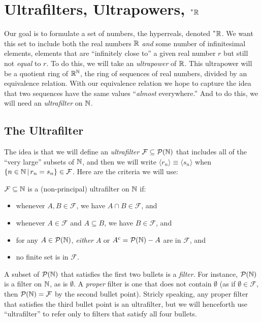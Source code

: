 \section{Ultrafilters, Ultrapowers, \texorpdfstring{$\prescript{*}{}{\mathbb{R}}$}{*R}}
Our goal is to formulate a set of numbers, the hyperreals, denoted $\prescript{*}{}{\mathbb{R}}$. We want this set to include both the real numbers $\mathbb{R}$ \textit{and} some number of infinitesimal elements, elements that are ``infinitely close to'' a given real number $r$ but still not \textit{equal} to $r$. To do this, we will take an \textit{ultrapower} of $\mathbb{R}$. This ultrapower will be a quotient ring of $\mathbb{R}^{\mathbb{N}}$, the ring of sequences of real numbers, divided by an equivalence relation. With our equivalence relation we hope to capture the idea that two sequences have the same values ``\textit{almost} everywhere.'' And to do this, we will need an \textit{ultrafilter} on $\mathbb{N}$.

\subsection{The Ultrafilter}
The idea is that we will define an \textit{ultrafilter} $\mathcal{F} \subseteq \mathcal{P}(\mathbb{N})$ that includes all of the ``very large'' subsets of $\mathbb{N}$, and then we will write $\langle r_n \rangle \equiv \langle s_n \rangle$ when $\{n \in \mathbb{N} \,|\, r_n = s_n\} \in \mathcal{F}$. Here are the criteria we will use:

\begin{defn}
    $\mathcal{F} \subseteq \mathbb{N}$ is a (non-principal) ultrafilter on $\mathbb{N}$ if:
    \begin{itemize}
        \item whenever $A, B \in \mathcal{F}$, we have $A \cap B \in \mathcal{F}$, and
        \item whenever $A \in \mathcal{F}$ and $A \subseteq B$, we have $B \in \mathcal{F}$, and
        \item for any $A \in \mathcal{P}(\mathbb{N})$, \textit{either} $A$ or $A^c = \mathcal{P}(\mathbb{N}) - A$ are in $\mathcal{F}$, and
        \item no finite set is in $\mathcal{F}$.
    \end{itemize}
\end{defn}

A subset of $\mathcal{P}(\mathbb{N})$ that satisfies the first two bullets is a \textit{filter}. For instance, $\mathcal{P}(\mathbb{N})$ is a filter on $\mathbb{N}$, as is $\emptyset$. A \textit{proper} filter is one that does not contain $\emptyset$ (as if $\emptyset \in \mathcal{F}$, then $\mathcal{P}(\mathbb{N}) = \mathcal{F}$ by the second bullet point). Stricly speaking, any proper filter that satisfies the third bullet point is an ultrafilter, but we will henceforth use ``ultrafilter'' to refer only to filters that satisfy all four bullets. 

